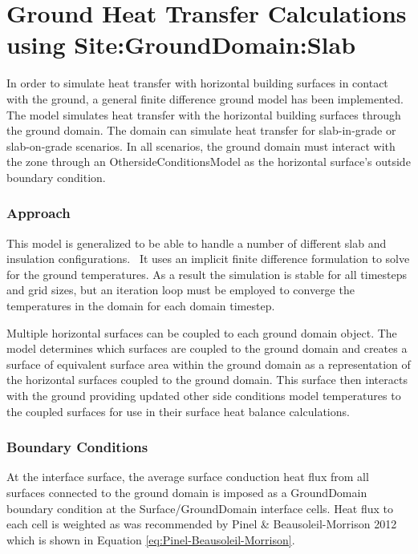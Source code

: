 \section{Ground Heat Transfer Calculations using Site:GroundDomain:Slab}\label{ground-heat-transfer-calculations-using-sitegrounddomainslab}

In order to simulate heat transfer with horizontal building surfaces in contact with the ground, a general finite difference ground model has been implemented. The model simulates heat transfer with the horizontal building surfaces through the ground domain. The domain can simulate heat transfer for slab-in-grade or slab-on-grade scenarios. In all scenarios, the ground domain must interact with the zone through an OthersideConditionsModel as the horizontal surface's outside boundary condition.

\subsubsection{Approach}\label{approach-001}

This model is generalized to be able to handle a number of different slab and insulation configurations.~ It uses an implicit finite difference formulation to solve for the ground temperatures. As a result the simulation is stable for all timesteps and grid sizes, but an iteration loop must be employed to converge the temperatures in the domain for each domain timestep.

Multiple horizontal surfaces can be coupled to each ground domain object. The model determines which surfaces are coupled to the ground domain and creates a surface of equivalent surface area within the ground domain as a representation of the horizontal surfaces coupled to the ground domain. This surface then interacts with the ground providing updated other side conditions model temperatures to the coupled surfaces for use in their surface heat balance calculations.

\subsubsection{Boundary Conditions}\label{boundary-conditions}

At the interface surface, the average surface conduction heat flux from all surfaces connected to the ground domain is imposed as a GroundDomain boundary condition at the Surface/GroundDomain interface cells. Heat flux to each cell is weighted as was recommended by Pinel \& Beausoleil-Morrison 2012 which is shown in Equation \ref{eq:Pinel-Beausoleil-Morrison}.

